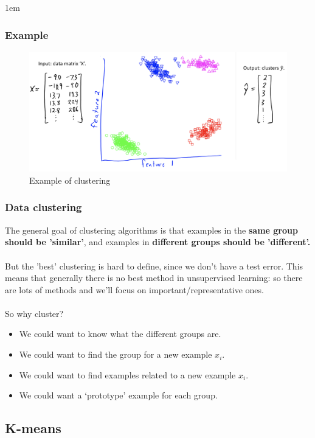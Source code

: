 \documentclass{article}
\def\blu#1{{\color{blu}#1}}
\def\gre#1{{\color{gre}#1}}
\def\red#1{{\color{red}#1}}
\theoremstyle{definition}
\begin{document}
\begingroup
\leftskip1em
	\subsubsection*{Example}
	\begin{figure}[H]
	\centering
	\includegraphics[width = 4.5in]{Pic6}
	\caption{Example of clustering}
	\end{figure}

\endgroup

\subsubsection*{Data clustering}
The general goal of clustering algorithms is that \blu{examples in the \textbf{same group should be 'similar'}}, and \blu{examples in \textbf{different groups should be 'different'.}}\\ \\
But the 'best' clustering is hard to define, since \red{we don't have a test error}. This means that generally there is no best method in unsupervised learning: so there are lots of methods and we’ll focus on important/representative ones. \\\\
So why cluster?
\begin{itemize}[label = -]
	\item We could want to \gre{know what the different groups are.}
	\item We could want to \gre{find the group for a new example $ x_i $.}
	\item We could want to \gre{find examples related to a new example $ x_i $.}
	\item We could want a \gre{‘prototype’ example for each group.}
\end{itemize}






\subsection*{K-means}
\end{document}
